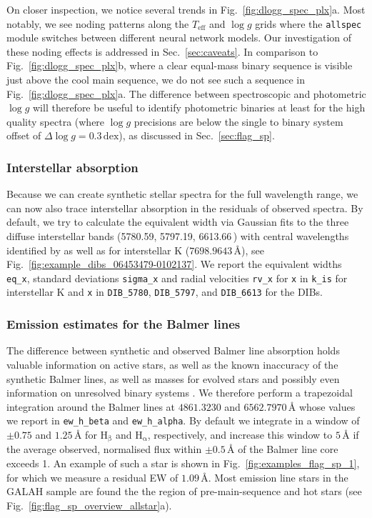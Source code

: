 \documentclass[
  journal=pasa,
  manuscript=research-paper, %
  year=2024,
  volume=37
]{cup-journal}
\newcommand{\Teff}{$T_\mathrm{eff}$\xspace}
\newcommand{\logg}{$\log g$\xspace}
\newcommand{\Angstroem}{\,\text{\AA}}	%
\begin{document}
On closer inspection, we notice several trends in Fig.~\ref{fig:dlogg_spec_plx}a. Most notably, we see noding patterns along the \Teff and \logg grids where the \texttt{allspec} module switches between different neural network models. Our investigation of these noding effects is addressed in Sec.~\ref{sec:caveats}. In comparison to Fig.~\ref{fig:dlogg_spec_plx}b, where a clear equal-mass binary sequence is visible just above the cool main sequence, we do not see such a sequence in Fig.~\ref{fig:dlogg_spec_plx}a. The difference between spectroscopic and photometric \logg will therefore be useful to identify photometric binaries at least for the high quality spectra (where \logg precisions are below the single to binary system offset of $\Delta \log g = 0.3\,\mathrm{dex}$), as discussed in Sec.~\ref{sec:flag_sp}.

\subsubsection{Interstellar absorption}

Because we can create synthetic stellar spectra for the full wavelength range, we can now also trace interstellar absorption in the residuals of observed spectra. By default, we try to calculate the equivalent width via Gaussian fits to the three diffuse interstellar bands (5780.59, 5797.19, 6613.66\Angstroem) with central wavelengths identified by \citet{Vogrincic2023} as well as for interstellar K ($7698.9643\,\text{\AA}$), see Fig.~\ref{fig:example_dibs_06453479-0102137}. We report the equivalent widths \texttt{eq\_x}, standard deviations \texttt{sigma\_x} and radial velocities \texttt{rv\_x} for \texttt{x} in \texttt{k\_is} for interstellar K and \texttt{x} in \texttt{DIB\_5780}, \texttt{DIB\_5797}, and \texttt{DIB\_6613} for the DIBs.

\subsubsection{Emission estimates for the Balmer lines}

The difference between synthetic and observed Balmer line absorption holds valuable information on active stars, as well as the known inaccuracy of the synthetic Balmer lines, as well as masses for evolved stars \citep{Bergemann2016} and possibly even information on unresolved binary systems \citep{Sayeed2024}. We therefore perform a trapezoidal integration around the Balmer lines at $4861.3230$ and $6562.7970\,\text{\AA}$ whose values we report in \texttt{ew\_h\_beta} and \texttt{ew\_h\_alpha}. By default we integrate in a window of $\pm 0.75$ and $1.25\,\text{\AA}$ for $\text{H}_\upbeta$ and $\text{H}_\upalpha$, respectively, and increase this window to $5\,\text{\AA}$ if the average observed, normalised flux within $\pm 0.5\,\text{\AA}$ of the Balmer line core exceeds 1. An example of such a star is shown in Fig.~\ref{fig:examples_flag_sp_1}, for which we measure a residual EW of $1.09\,\text{\AA}$. Most emission line stars in the GALAH sample are found the the region of pre-main-sequence and hot stars (see Fig.~\ref{fig:flag_sp_overview_allstar}a).
\end{document}
